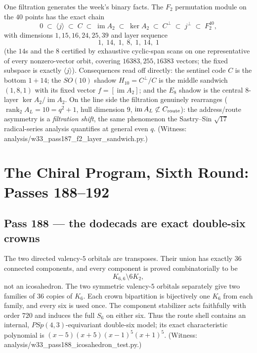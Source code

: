 \documentclass[12pt,a4paper]{article}
\def\mathbb#1{#1}%
\def\mathrm#1{#1}%
\def\mathbf#1{#1}%
\def\texttt#1{#1}%
\theoremstyle{definition}
\newcommand{\PSp}{\mathrm{PSp}}
\begin{document}
One filtration generates the week's binary facts. The $\mathbb F_2$
permutation module on the $40$ points has the exact chain
\[
  0\;\subset\;\langle\mathbf j\rangle\;\subset\;C\;\subset\;
  \operatorname{im}A_2\;\subset\;\ker A_2\;\subset\;C^\perp\;\subset\;
  \mathbf j^\perp\;\subset\;\mathbb F_2^{40},
\]
with dimensions $1,15,16,24,25,39$ and layer sequence
\[
  \boxed{\,1,\;14,\;1,\;8,\;1,\;14,\;1\,}
\]
(the $14$s and the $8$ certified by exhaustive cyclic-span scans on one
representative of every nonzero-vector orbit, covering
$16383,255,16383$ vectors; the
fixed subspace is exactly $\langle\mathbf j\rangle$). Consequences read
off directly: the sentinel code $C$ is the bottom $1{+}14$; the
$\mathrm{SO}(10)$ shadow $H_{10}=C^\perp/C$ is the middle sandwich
$(1,8,1)$ with its fixed vector $f=[\operatorname{im}A_2]$; and the $E_8$
shadow is the central $8$-layer $\ker A_2/\operatorname{im}A_2$. On the
line side the filtration genuinely rearranges
($\operatorname{rank}_2A_L=10=q^2{+}1$, hull dimension $9$,
$\operatorname{im}A_L\not\subset C_{\rm route}$): the address/route
asymmetry is a \emph{filtration shift}, the same phenomenon the
Sastry--Sin $\sqrt{17}$ radical-series analysis quantifies at general
even $q$. (Witness:
\texttt{analysis/w33\_pass187\_f2\_layer\_sandwich.py}.)

\section{The Chiral Program, Sixth Round: Passes 188--192}
\label{sec:chiral-program-six}

\subsection{Pass 188 --- the dodecads are exact double-six crowns}
\label{ssec:pass188}

The two directed valency-$5$ orbitals are transposes.  Their union has
exactly $36$ connected components, and every component is proved
combinatorially to be
\[
  K_{6,6}\setminus 6K_2,
\]
not an icosahedron.  The two symmetric valency-$5$ orbitals separately
give two families of $36$ copies of $K_6$.  Each crown bipartition is
bijectively one $K_6$ from each family, and every six is used once.  The
component stabilizer acts faithfully with order $720$ and induces the
full $S_6$ on either six.  Thus the route shell contains an internal,
$\PSp(4,3)$-equivariant double-six model; its exact characteristic
polynomial is
$(x-5)(x+5)(x-1)^5(x+1)^5$. (Witness:
\texttt{analysis/w33\_pass188\_icosahedron\_test.py}.)
\end{document}
